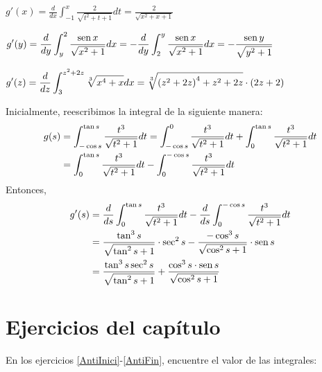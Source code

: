 \begin{parrafonumerado}

\item $\displaystyle{g'(x)=\frac{d}{dx}\int_{-1}^{x}\frac{2}{\sqrt{t^{2}+t+1}}dt
=\frac{2}{\sqrt{x^{2}+x+1}}}$

\item $\displaystyle{g^\prime(y)
=\frac{d}{dy}\int_{y}^{2}\frac{\operatorname{sen}x}{\sqrt{x^{2}+1}}dx
=-\frac{d}{dy}\int_{2}^{y}\frac{\operatorname{sen}x}{\sqrt{x^{2}+1}}dx}
=-\frac{\operatorname{sen} y}{\sqrt{y^{2}+1}}$

\item $\displaystyle{g'(z)=\frac{d}{dz}\int_{3}^{z^{2}+2z}\sqrt[3]{x^{4}+x}dx=\sqrt[3]{%
\left( z^{2}+2z\right) ^{4}+z^{2}+2z}\cdot \left( 2z+2\right)}$

\item Inicialmente, reescribimos la integral de la siguiente manera:
\begin{align*}
g(s)&=\int_{-\cos s}^{\tan s}\frac{t^{3}}{\sqrt{t^{2}+1}}dt=\int_{-\cos
s}^{0}\frac{t^{3}}{\sqrt{t^{2}+1}}dt+\int_{0}^{\tan s}\frac{t^{3}}{\sqrt{%
t^{2}+1}}dt\\
&=\int_{0}^{\tan s}\frac{t^{3}}{\sqrt{t^{2}+1}}
dt-\int_{0}^{-\cos s}\frac{t^{3}}{\sqrt{t^{2}+1}}dt
\end{align*}
Entonces,
\begin{align*}
g'(s)&=\frac{d}{ds}\int_{0}^{\tan s}\frac{t^{3}}{\sqrt{t^{2}+1}}dt-\frac{d}{ds}\int_{0}^{-\cos s}\frac{t^{3}}{\sqrt{t^{2}+1}}dt\\
&=\frac{\tan ^{3}s}{\sqrt{\tan ^{2}s+1}}\cdot \sec ^{2}s-\frac{-\cos ^{3}s}{\sqrt{\cos ^{2}s+1}}\cdot \operatorname{sen} s\\
&=\frac{\tan ^{3}s\sec ^{2}s}{\sqrt{\tan ^{2}s+1}}+\frac{\cos^{3}s\cdot \operatorname{sen} s}{\sqrt{\cos ^{2}s+1}}
\end{align*}
\end{parrafonumerado}

\section{Ejercicios del capítulo~\thechapter}

\group

En los ejercicios \ref{AntiInici}-\ref{AntiFin}, encuentre el valor de las integrales:



